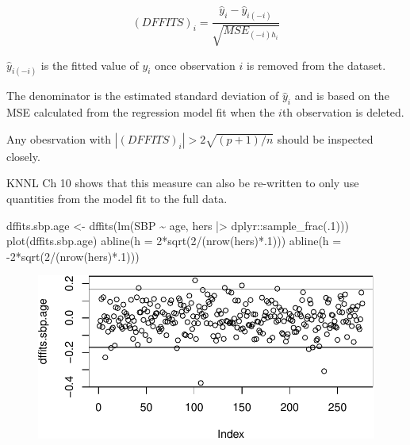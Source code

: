 \documentclass[
  letterpaper,
  DIV=11,
  numbers=noendperiod]{scrreport}
\newenvironment{Shaded}{\begin{snugshade}}{\end{snugshade}}
\newcommand{\AttributeTok}[1]{\textcolor[rgb]{0.40,0.45,0.13}{#1}}
\newcommand{\DecValTok}[1]{\textcolor[rgb]{0.68,0.00,0.00}{#1}}
\newcommand{\FunctionTok}[1]{\textcolor[rgb]{0.28,0.35,0.67}{#1}}
\newcommand{\NormalTok}[1]{\textcolor[rgb]{0.00,0.23,0.31}{#1}}
\newcommand{\OtherTok}[1]{\textcolor[rgb]{0.00,0.23,0.31}{#1}}
\newcommand{\SpecialCharTok}[1]{\textcolor[rgb]{0.37,0.37,0.37}{#1}}
\begin{document}
\[(DFFITS)_i = \frac{\hat y_i - \hat y_{i(-i)}}{\sqrt{MSE_{(-i)h_i}}}\]

\(\hat y_{i(-i)}\) is the fitted value of \(y_i\) once observation \(i\)
is removed from the dataset.

The denominator is the estimated standard deviation of \(\hat y_i\) and
is based on the MSE calculated from the regression model fit when the
\(i\)th observation is deleted.

Any obesrvation with \(|(DFFITS)_i| > 2 \sqrt{(p+1)/n}\) should be
inspected closely.

KNNL Ch 10 shows that this measure can also be re-written to only use
quantities from the model fit to the full data.

\begin{Shaded}
\begin{Highlighting}[]
\NormalTok{dffits.sbp.age }\OtherTok{\textless{}{-}} \FunctionTok{dffits}\NormalTok{(}\FunctionTok{lm}\NormalTok{(SBP }\SpecialCharTok{\textasciitilde{}}\NormalTok{ age, hers }\SpecialCharTok{|\textgreater{}}\NormalTok{ dplyr}\SpecialCharTok{::}\FunctionTok{sample\_frac}\NormalTok{(.}\DecValTok{1}\NormalTok{)))}
\FunctionTok{plot}\NormalTok{(dffits.sbp.age)}
\FunctionTok{abline}\NormalTok{(}\AttributeTok{h =} \DecValTok{2}\SpecialCharTok{*}\FunctionTok{sqrt}\NormalTok{(}\DecValTok{2}\SpecialCharTok{/}\NormalTok{(}\FunctionTok{nrow}\NormalTok{(hers)}\SpecialCharTok{*}\NormalTok{.}\DecValTok{1}\NormalTok{)))}
\FunctionTok{abline}\NormalTok{(}\AttributeTok{h =} \SpecialCharTok{{-}}\DecValTok{2}\SpecialCharTok{*}\FunctionTok{sqrt}\NormalTok{(}\DecValTok{2}\SpecialCharTok{/}\NormalTok{(}\FunctionTok{nrow}\NormalTok{(hers)}\SpecialCharTok{*}\NormalTok{.}\DecValTok{1}\NormalTok{)))}
\end{Highlighting}
\end{Shaded}

\begin{figure}[H]

{\centering \includegraphics{week4/week4_files/figure-pdf/unnamed-chunk-13-1.pdf}

}

\end{figure}
\end{document}
